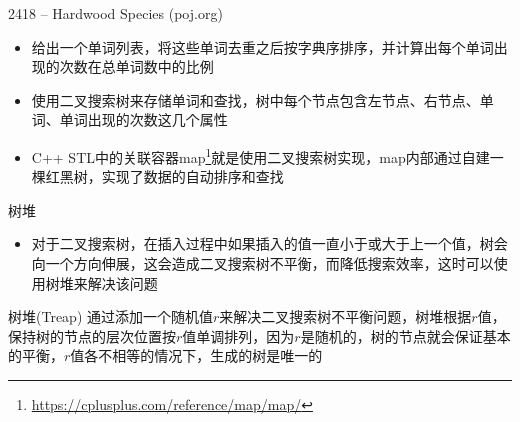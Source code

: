 \begin{frame}{2418 -- Hardwood Species (poj.org)}
    \begin{itemize}
        \item 给出一个单词列表，将这些单词去重之后按字典序排序，并计算出每个单词出现的次数在总单词数中的比例
        \vfill
        \item 使用二叉搜索树来存储单词和查找，树中每个节点包含左节点、右节点、单词、单词出现的次数这几个属性
        \vfill
        \item C++ STL中的关联容器map\footnote{\url{https://cplusplus.com/reference/map/map/}}就是使用二叉搜索树实现，map内部通过自建一棵红黑树，实现了数据的自动排序和查找
    \end{itemize}
\end{frame}
\begin{frame}{树堆}
    \begin{itemize}
        \item  对于二叉搜索树，在插入过程中如果插入的值一直小于或大于上一个值，树会向一个方向伸展，这会造成二叉搜索树不平衡，而降低搜索效率，这时可以使用树堆来解决该问题
    \end{itemize}
    \vfill
    \begin{block}{树堆(Treap)}
        通过添加一个随机值$r$来解决二叉搜索树不平衡问题，树堆根据$r$值，保持树的节点的层次位置按$r$值单调排列，因为$r$是随机的，树的节点就会保证基本的平衡，$r$值各不相等的情况下，生成的树是唯一的
    \end{block}
\end{frame}
